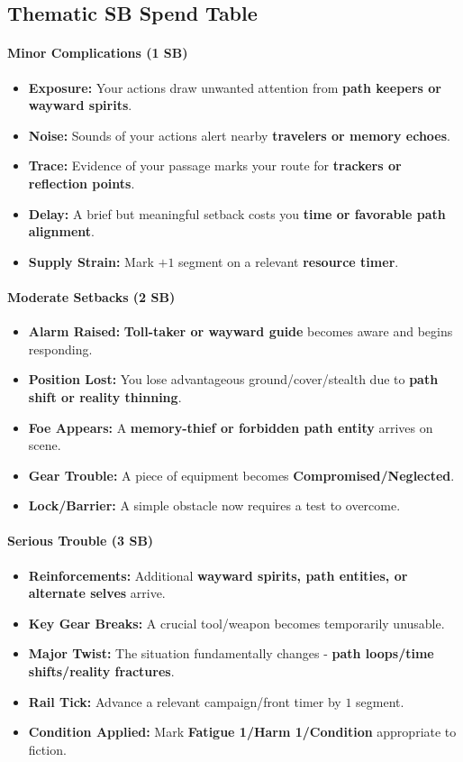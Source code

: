 \subsection*{Thematic SB Spend Table}
\label{sec:ways-between-sb}

\paragraph{Minor Complications (1 SB)}
\begin{itemize}
\item \textbf{Exposure:} Your actions draw unwanted attention from \textbf{path keepers or wayward spirits}.
\item \textbf{Noise:} Sounds of your actions alert nearby \textbf{travelers or memory echoes}.
\item \textbf{Trace:} Evidence of your passage marks your route for \textbf{trackers or reflection points}.
\item \textbf{Delay:} A brief but meaningful setback costs you \textbf{time or favorable path alignment}.
\item \textbf{Supply Strain:} Mark $+1$ segment on a relevant \textbf{resource timer}.
\end{itemize}

\paragraph{Moderate Setbacks (2 SB)}
\begin{itemize}
\item \textbf{Alarm Raised:} \textbf{Toll-taker or wayward guide} becomes aware and begins responding.
\item \textbf{Position Lost:} You lose advantageous ground/cover/stealth due to \textbf{path shift or reality thinning}.
\item \textbf{Foe Appears:} A \textbf{memory-thief or forbidden path entity} arrives on scene.
\item \textbf{Gear Trouble:} A piece of equipment becomes \textbf{Compromised/Neglected}.
\item \textbf{Lock/Barrier:} A simple obstacle now requires a test to overcome.
\end{itemize}

\paragraph{Serious Trouble (3 SB)}
\begin{itemize}
\item \textbf{Reinforcements:} Additional \textbf{wayward spirits, path entities, or alternate selves} arrive.
\item \textbf{Key Gear Breaks:} A crucial tool/weapon becomes temporarily unusable.
\item \textbf{Major Twist:} The situation fundamentally changes - \textbf{path loops/time shifts/reality fractures}.
\item \textbf{Rail Tick:} Advance a relevant campaign/front timer by $1$ segment.
\item \textbf{Condition Applied:} Mark \textbf{Fatigue 1/Harm 1/Condition} appropriate to fiction.
\end{itemize}

